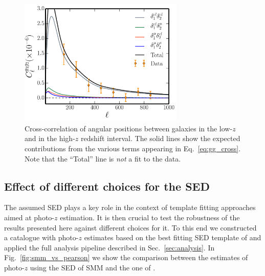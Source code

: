 \begin{figure} %
\centering %
\includegraphics[width=0.7\textwidth]{Chapter4/Images/gg_cross_data_theory_GAMA_026}
\caption{Cross-correlation of angular positions between galaxies in the low-$z$ and in the high-$z$ redshift interval. The solid lines show the expected contributions from the various terms appearing in Eq.~\eqref{eq:gg_cross}. Note that the ``Total'' line is \emph{not} a fit to the data.
\label{fig:gg_cross}}
\end{figure}

\subsection{Effect of different choices for the SED}
\label{sec:SED}
The assumed SED plays a key role in the context of template fitting approaches aimed at photo-$z$ estimation. It is then crucial to test the robustness of the results presented here against different choices for it. To this end we constructed a catalogue with photo-$z$ estimates based on the best fitting SED template of \cite{Pearson2013} and applied the full analysis pipeline described in Sec.~\eqref{sec:analysis}. In Fig.~\eqref{fig:smm_vs_pearson} we show the comparison between the estimates of photo-$z$ using the \gls{SED} of SMM and the one of \cite{Pearson2013}.

